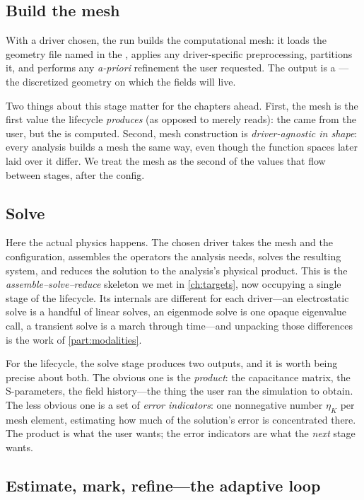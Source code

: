 \subsection{Build the mesh}

With a driver chosen, the run builds the computational mesh: it loads the
geometry file named in the , applies any driver-specific
preprocessing, partitions it, and performs any \emph{a-priori} refinement the
user requested. The output is a ---the discretized geometry on which
the fields will live.

Two things about this stage matter for the chapters ahead. First, the mesh is
the first value the lifecycle \emph{produces} (as opposed to merely reads): the
 came from the user, but the  is computed. Second, mesh
construction is \emph{driver-agnostic in shape}: every analysis builds a mesh the
same way, even though the function spaces later laid over it differ. We treat the
mesh as the second of the values that flow between stages, after the config.

\subsection{Solve}

Here the actual physics happens. The chosen driver takes the mesh and the
configuration, assembles the operators the analysis needs, solves the resulting
system, and reduces the solution to the analysis's physical product. This is the
\emph{assemble--solve--reduce} skeleton we met in \cref{ch:targets}, now occupying
a single stage of the lifecycle. Its internals are different for each driver---an
electrostatic solve is a handful of linear solves, an eigenmode solve is one
opaque eigenvalue call, a transient solve is a march through time---and unpacking
those differences is the work of \cref{part:modalities}.

For the lifecycle, the solve stage produces two outputs, and it is worth being
precise about both. The obvious one is the \emph{product}: the capacitance
matrix, the S-parameters, the field history---the thing the user ran the
simulation to obtain. The less obvious one is a set of \emph{error
indicators}: one nonnegative number $\eta_K$ per mesh element, estimating how
much of the solution's error is concentrated there. The product is what the user
wants; the error indicators are what the \emph{next} stage wants.

\subsection{Estimate, mark, refine---the adaptive loop}
\label{sec:amrloop}

